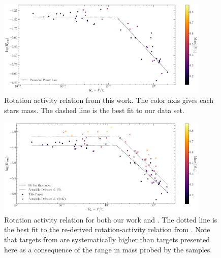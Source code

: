 \begin{table}[]
    \centering
    \setlength{\tabcolsep}{4pt}
	\renewcommand{\arraystretch}{0.9} %
    
	\caption{Calculated Rossby Numbers and $R'_{HK}$ values. All circular data
	points in Figures \ref{fig:RpHKvsRossbySelf} \& \ref{fig:RpHKvsRossbyDef}
	are present in this table. Masses are taken from the MEarth database. A
	machine readable version of this table is \textbf{available}}
    \label{tab:finalData}
\end{table}
\begin{figure}
    \centering
    \includegraphics[width=0.9\textwidth]{figures/magActivity/RpHKvsR0_MC_justThisPaper.pdf}
	\caption{Rotation activity relation from this work. The color axis gives
	each stars mass. The dashed line is the best fit to our data set.}
    \label{fig:RpHKvsRossbySelf}
\end{figure}
\begin{figure}
    \centering
    \includegraphics[width=0.9\textwidth]{figures/magActivity/RpHKvsR0_MC.pdf}
	\caption{Rotation activity relation for both our work and \citet{Def17}.
	The dotted line is the best fit to the re-derived rotation-activity
	relation from \citet{Def17}.  Note that targets from \citet{Def17} are
	systematically higher than targets presented here as a consequence of the
	range in mass probed by the samples.}
    \label{fig:RpHKvsRossbyDef}
\end{figure}
